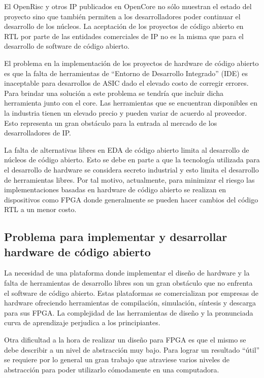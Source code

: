 El OpenRisc y otros IP publicados en OpenCore no sólo muestran el
estado del proyecto sino que también permiten a los desarrolladores
poder continuar el desarrollo de los núcleos. La aceptación de los
proyectos de código abierto en RTL por parte de las entidades
comerciales de IP no es la misma que para el desarrollo de software de
código abierto.

El problema en la implementación de los proyectos de hardware de
código abierto es que la falta de herramientas de ``Entorno de
Desarrollo Integrado'' (IDE) es inaceptable para desarrollos de ASIC
dado el elevado costo de corregir errores. Para brindar una solución
a este problema se tendría que incluir dicha herramienta junto con el
core. Las herramientas que se encuentran disponibles en la industria
tienen un elevado precio y pueden variar de acuerdo al proveedor. Esto
representa un gran obstáculo para la entrada al mercado de los
desarrolladores de IP.

La falta de alternativas libres en EDA de código abierto limita al
desarrollo de núcleos de código abierto. Esto se debe en parte a que
la tecnología utilizada para el desarrollo de hardware se considera
secreto industrial y esto limita el desarrollo de herramientas
libres. Por tal motivo, actualmente, para minimizar el riesgo las
implementaciones basadas en hardware de código abierto se realizan en
dispositivos como FPGA donde generalmente se pueden hacer cambios del
código RTL a un menor costo.


\subsection{Problema para implementar y desarrollar hardware de código abierto}

La necesidad de una plataforma donde implementar el diseño de hardware
y la falta de herramientas de desarrollo libres son un gran obstáculo
que no enfrenta el software de código abierto. Estas plataformas se
comercializan por empresas de hardware ofreciendo herramientas de
compilación, simulación, síntesis y descarga para sus FPGA. La
complejidad de las herramientas de diseño y la pronunciada curva de
aprendizaje perjudica a los principiantes.

Otra dificultad a la hora de realizar un diseño para FPGA es que el
mismo se debe describir a un nivel de abstracción muy bajo. Para
lograr un resultado ``útil'' se requiere por lo general un gran
trabajo que atraviese varios niveles de abstracción para poder
utilizarlo cómodamente en una computadora.

